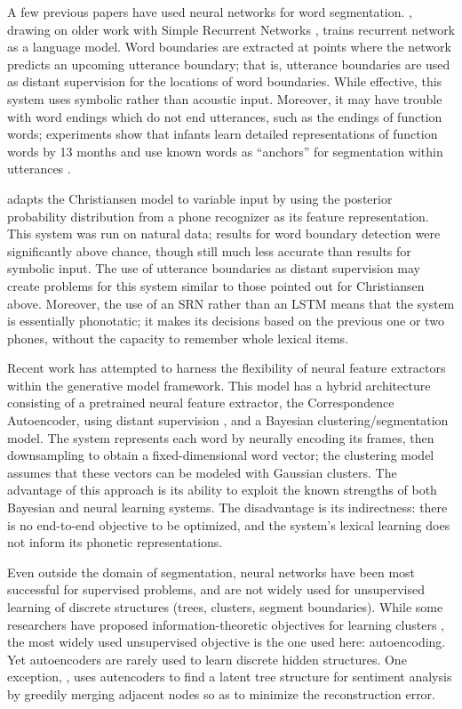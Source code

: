 \documentclass[11pt,letterpaper]{article}
\begin{document}
A few previous papers have used neural networks for word
segmentation. , drawing on older work with
Simple Recurrent Networks \cite{Elman90}, trains recurrent network as
a language model. Word boundaries are extracted at points where the
network predicts an upcoming utterance boundary; that is, utterance
boundaries are used as distant supervision for the locations of word
boundaries. While effective, this system uses symbolic rather than
acoustic input. Moreover, it may have trouble with word endings which
do not end utterances, such as the endings of function words;
experiments show that infants learn detailed representations of
function words by 13 months \cite{Shi06} and use known words as
``anchors'' for segmentation within utterances \cite{Bortfeld05}.

 adapts the Christiansen model to variable input by
using the posterior probability distribution from a phone recognizer
as its feature representation. This system was run on natural data;
results for word boundary detection were significantly above chance,
though still much less accurate than results for symbolic input. The
use of utterance boundaries as distant supervision may create problems
for this system similar to those pointed out for Christiansen
above. Moreover, the use of an SRN rather than an LSTM means that the
system is essentially phonotatic; it makes its decisions based on the
previous one or two phones, without the capacity to remember whole
lexical items.

Recent work \cite{Kamper16} has attempted to harness the flexibility
of neural feature extractors within the generative model
framework. This model has a hybrid architecture consisting of a
pretrained neural feature extractor, the Correspondence Autoencoder,
using distant supervision \cite{Kamper15}, and a Bayesian
clustering/segmentation model. The system represents each word by
neurally encoding its frames, then downsampling to obtain a
fixed-dimensional word vector; the clustering model assumes that these
vectors can be modeled with Gaussian clusters. The advantage of this
approach is its ability to exploit the known strengths of both
Bayesian and neural learning systems. The disadvantage is its
indirectness: there is no end-to-end objective to be optimized, and
the system's lexical learning does not inform its phonetic
representations.

Even outside the domain of segmentation, neural networks have been
most successful for supervised problems, and are not widely used for
unsupervised learning of discrete structures (trees, clusters, segment
boundaries). While some researchers have proposed
information-theoretic objectives for learning clusters
\cite{Klapper01}, the most widely used unsupervised objective is the
one used here: autoencoding. Yet autoencoders are rarely used to learn
discrete hidden structures. One exception, , uses
autencoders to find a latent tree structure for sentiment analysis by
greedily merging adjacent nodes so as to minimize the reconstruction
error.
\end{document}
